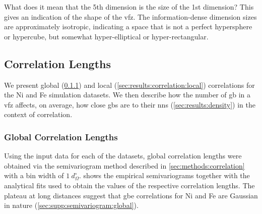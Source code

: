 \documentclass[final,twocolumn,12pt]{elsarticle}
\begin{document}
	\begin{table}[!htb]
	    \centering
    	    \caption{Dimension of \gls{pca} transformed coordinates (Dimension) and percent variance explained ($v$) for a set of \num{50000} \glspl{vfzgbo}. The first 5 dimensions cumulatively explain \percExplained{} of the variance. }
    	    \label{tab:pca-explained}
	\end{table}	
	
	What does it mean that the 5th dimension is \percFiveVsOne{} the size of the 1st dimension? This gives an indication of the shape of the \gls{vfz}. The information-dense dimension sizes are approximately isotropic, indicating a space that is not a perfect hypersphere or hypercube, but somewhat hyper-elliptical or hyper-rectangular.
	\subsection{Correlation Lengths} \label{sec:results:correlation}
	
	We present global (\cref{sec:results:correlation:global}) and local (\cref{sec:results:correlation:local}) correlations for the Ni and Fe simulation datasets. We then describe how the number of \gls{gb} in a \gls{vfz} affects, on average, how close \glspl{gb} are to their \glspl{nn} (\cref{sec:results:density}) in the context of correlation.
	
	\subsubsection{Global Correlation Lengths} \label{sec:results:correlation:global}
	
	Using the input data for each of the datasets, global correlation lengths were obtained via the semivariogram method described in \cref{sec:methods:correlation} with a bin width of ${1\ d_{\Omega}^{\circ}}$.  shows the empirical semivariograms together with the analytical fits used to obtain the values of the respective correlation lengths. The plateau at long distances suggest that \gls{gbe} correlations for Ni and Fe are Gaussian in nature (\cref{sec:supp:semivariogram:global}).
	
\end{document}
